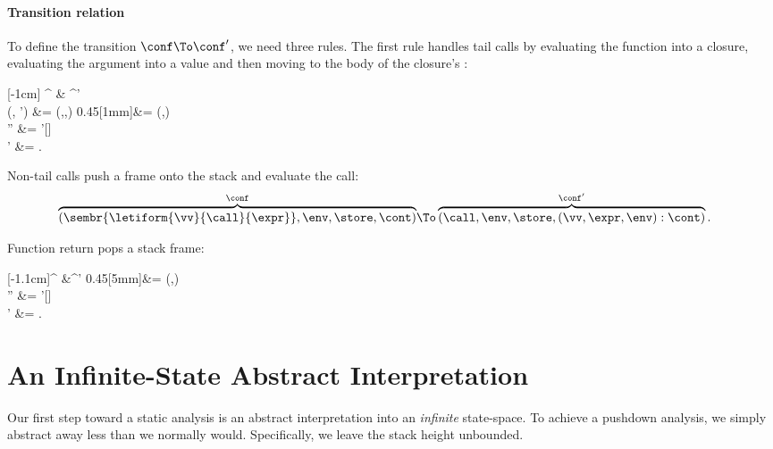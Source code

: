 \paragraph{Transition relation}
To define the transition $\conf \To \conf'$, we need three rules.
The first rule handles tail calls by evaluating the function into a closure, evaluating the argument into a value and then moving to the body of the closure's \lamterm{}:
\begin{center}
  [-1cm]{
  \overbrace{(\sembr{\appform{\fexpr}{\aexpr}}, \env, \store, \cont)}^{\conf}
  &\To
  ^{\conf'}
  \\
  (\sembr{\lamform{\vv}{\expr}}, \env') &= \ArgEval(\fexpr,\env,\store)}
  {0.45}[1mm]{\addr &= \alloc(\vv,\conf)
  \\
  \env'' &= \env'[\vv \mapsto \addr]
  \\
  \store' &= \store[\addr \mapsto \ArgEval(\aexpr,\env,\store)]
  \text.}
\end{center}

\noindent
Non-tail calls push a frame onto the stack and evaluate the call:
\begin{align*}
  \overbrace{(\sembr{\letiform{\vv}{\call}{\expr}}, \env, \store, \cont)}^{\conf}
  &\To
  \overbrace{(\call,\env,\store, (\vv,\expr,\env) : \cont)}^{\conf'}
  \text.
\end{align*}

\noindent
Function return pops a stack frame:
\begin{center}
  [-1.1cm]{^{\conf} &\To {}^{\conf'} }
  {0.45}[5mm]{\addr &= \alloc(\vv,\conf)
    \\
    \env'' &= \env'[\vv \mapsto \addr]
    \\
    \store' &= \store[\addr \mapsto \ArgEval(\aexpr,\env,\store)]
    \text.}
\end{center}
\section{An Infinite-State Abstract Interpretation}
\label{sec:abstraction}
Our first step toward a static analysis 
is an abstract interpretation
into an \emph{infinite} state-space.
To achieve a pushdown analysis,
we simply
abstract away less than we normally would.
Specifically, 
we leave the stack height unbounded.

